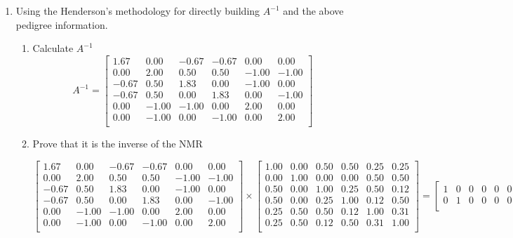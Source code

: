 \documentclass[12pt,a4paper]{paper}
\begin{document}
\begin{enumerate}
\item Using the Henderson's methodology for directly building $A^{-1}$ and the above pedigree information.
\begin{enumerate}
\item Calculate $A^{-1}$
\[A^{-1} = \left[
\begin{array}{rrrrrr}
1.67 & 0.00 & -0.67 & -0.67 & 0.00 & 0.00 \\ 
  0.00 & 2.00 & 0.50 & 0.50 & -1.00 & -1.00 \\ 
  -0.67 & 0.50 & 1.83 & 0.00 & -1.00 & 0.00 \\ 
  -0.67 & 0.50 & 0.00 & 1.83 & 0.00 & -1.00 \\ 
  0.00 & -1.00 & -1.00 & 0.00 & 2.00 & 0.00 \\ 
  0.00 & -1.00 & 0.00 & -1.00 & 0.00 & 2.00 \\ 
\end{array}
\right]\]
\item Prove that it is the inverse of the NMR
\begin{scriptsize}
\[
\left[
\begin{array}{rrrrrr}
1.67 & 0.00 & -0.67 & -0.67 & 0.00 & 0.00 \\ 
  0.00 & 2.00 & 0.50 & 0.50 & -1.00 & -1.00 \\ 
  -0.67 & 0.50 & 1.83 & 0.00 & -1.00 & 0.00 \\ 
  -0.67 & 0.50 & 0.00 & 1.83 & 0.00 & -1.00 \\ 
  0.00 & -1.00 & -1.00 & 0.00 & 2.00 & 0.00 \\ 
  0.00 & -1.00 & 0.00 & -1.00 & 0.00 & 2.00 \\ 
\end{array}
\right] \times \left[
\begin{array}{rrrrrr}
1.00 & 0.00 & 0.50 & 0.50 & 0.25 & 0.25 \\ 
  0.00 & 1.00 & 0.00 & 0.00 & 0.50 & 0.50 \\ 
  0.50 & 0.00 & 1.00 & 0.25 & 0.50 & 0.12 \\ 
  0.50 & 0.00 & 0.25 & 1.00 & 0.12 & 0.50 \\ 
  0.25 & 0.50 & 0.50 & 0.12 & 1.00 & 0.31 \\ 
  0.25 & 0.50 & 0.12 & 0.50 & 0.31 & 1.00 \\ 
\end{array}
\right]= \left[\begin{array}{rrrrrr}
1 & 0 & 0 & 0 & 0 & 0 \\ 
  0 & 1 & 0 & 0 & 0 & 0 \\ 

\end{array}\]
\end{scriptsize}
\end{enumerate}
\end{enumerate}
\end{document}
